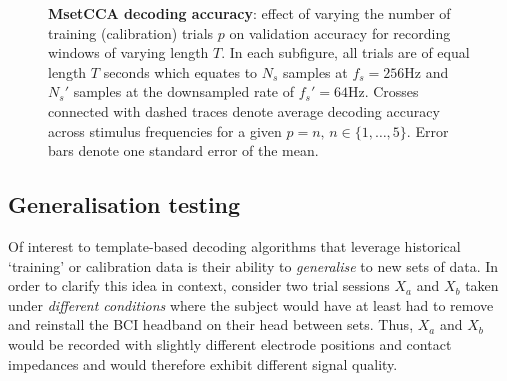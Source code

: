 \begin{figure}[htp]
\hfill
{}

\caption[MsetCCA decoding accuracy: effect of varying the number of training (calibration) trials $p$ on validation accuracy for recording windows of varying length $T$.]{\textbf{MsetCCA decoding accuracy}: effect of varying the number of training (calibration) trials $p$ on validation accuracy for recording windows of varying length $T$. In each subfigure, all trials are of equal length $T$ seconds which equates to $N_s$ samples at $f_s=256$Hz and $N_s'$ samples at the downsampled rate of $f_s'=64$Hz. Crosses connected with dashed traces denote average decoding accuracy across stimulus frequencies for a given $p=n, \, n\in\{1, \dots, 5\}$. Error bars denote one standard error of the mean.}
\label{fig:mset-acc-nt}
\end{figure}

\subsection{Generalisation testing}
Of interest to template-based decoding algorithms that leverage historical `training' or calibration data is their ability to \textit{generalise} to new sets of data. In order to clarify this idea in context, consider two trial sessions $X_a$ and $X_b$ taken under \textit{different conditions} where the subject would have at least had to remove and reinstall the BCI headband on their head between sets. Thus, $X_a$ and $X_b$ would be recorded with slightly different electrode positions and contact impedances and would therefore exhibit different signal quality. 

